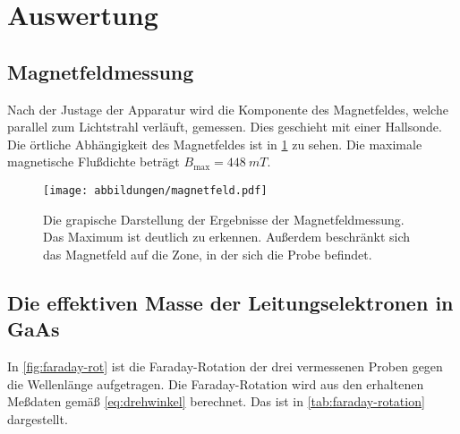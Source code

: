 
\section{Auswertung}

\subsection{Magnetfeldmessung}
Nach der Justage der Apparatur wird die Komponente des Magnetfeldes,
welche parallel zum Lichtstrahl verläuft, gemessen.  Dies geschieht mit
einer Hallsonde.  Die örtliche Abhängigkeit des Magnetfeldes ist in
\cref{fig:magnetfeld} zu sehen.  Die maximale magnetische Flußdichte
beträgt $B_\text{max} = \SI{448}{mT}$.

\begin{figure}
  \centering
  \texttt{[image: abbildungen/magnetfeld.pdf]}
  \caption{Die grapische Darstellung der Ergebnisse der
    Magnetfeldmessung.  Das Maximum ist deutlich zu erkennen.  Außerdem
    beschränkt sich das Magnetfeld auf die Zone, in der sich die Probe
    befindet.}
  \label{fig:magnetfeld}
\end{figure}

\subsection{Die effektiven Masse der Leitungselektronen in GaAs}

In \cref{fig:faraday-rot} ist die Faraday-Rotation der drei vermessenen
Proben gegen die Wellenlänge aufgetragen.  Die Faraday-Rotation wird aus
den erhaltenen Meßdaten gemäß \cref{eq:drehwinkel} berechnet. Das ist in
\cref{tab:faraday-rotation} dargestellt.

